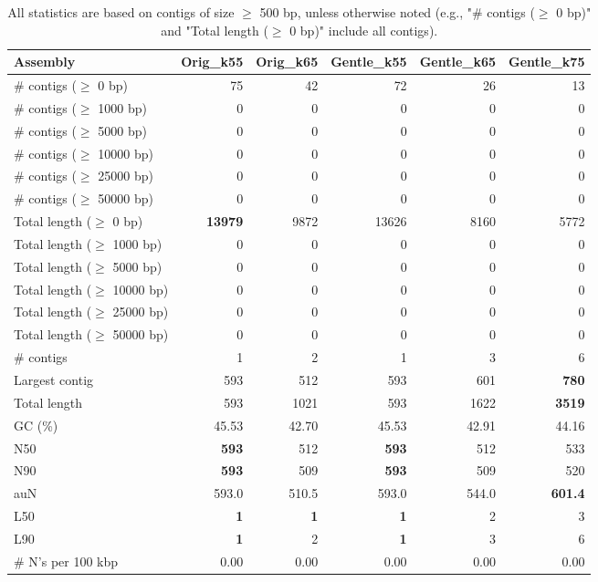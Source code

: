\documentclass[12pt,a4paper]{article}
\begin{document}
\begin{table}[ht]
\begin{center}
\caption{All statistics are based on contigs of size $\geq$ 500 bp, unless otherwise noted (e.g., "\# contigs ($\geq$ 0 bp)" and "Total length ($\geq$ 0 bp)" include all contigs).}
\begin{tabular}{|l*{5}{|r}|}
\hline
Assembly & Orig\_k55 & Orig\_k65 & Gentle\_k55 & Gentle\_k65 & Gentle\_k75 \\ \hline
\# contigs ($\geq$ 0 bp) & 75 & 42 & 72 & 26 & 13 \\ \hline
\# contigs ($\geq$ 1000 bp) & 0 & 0 & 0 & 0 & 0 \\ \hline
\# contigs ($\geq$ 5000 bp) & 0 & 0 & 0 & 0 & 0 \\ \hline
\# contigs ($\geq$ 10000 bp) & 0 & 0 & 0 & 0 & 0 \\ \hline
\# contigs ($\geq$ 25000 bp) & 0 & 0 & 0 & 0 & 0 \\ \hline
\# contigs ($\geq$ 50000 bp) & 0 & 0 & 0 & 0 & 0 \\ \hline
Total length ($\geq$ 0 bp) & {\bf 13979} & 9872 & 13626 & 8160 & 5772 \\ \hline
Total length ($\geq$ 1000 bp) & 0 & 0 & 0 & 0 & 0 \\ \hline
Total length ($\geq$ 5000 bp) & 0 & 0 & 0 & 0 & 0 \\ \hline
Total length ($\geq$ 10000 bp) & 0 & 0 & 0 & 0 & 0 \\ \hline
Total length ($\geq$ 25000 bp) & 0 & 0 & 0 & 0 & 0 \\ \hline
Total length ($\geq$ 50000 bp) & 0 & 0 & 0 & 0 & 0 \\ \hline
\# contigs & 1 & 2 & 1 & 3 & 6 \\ \hline
Largest contig & 593 & 512 & 593 & 601 & {\bf 780} \\ \hline
Total length & 593 & 1021 & 593 & 1622 & {\bf 3519} \\ \hline
GC (\%) & 45.53 & 42.70 & 45.53 & 42.91 & 44.16 \\ \hline
N50 & {\bf 593} & 512 & {\bf 593} & 512 & 533 \\ \hline
N90 & {\bf 593} & 509 & {\bf 593} & 509 & 520 \\ \hline
auN & 593.0 & 510.5 & 593.0 & 544.0 & {\bf 601.4} \\ \hline
L50 & {\bf 1} & {\bf 1} & {\bf 1} & 2 & 3 \\ \hline
L90 & {\bf 1} & 2 & {\bf 1} & 3 & 6 \\ \hline
\# N's per 100 kbp & 0.00 & 0.00 & 0.00 & 0.00 & 0.00 \\ \hline
\end{tabular}
\end{center}
\end{table}
\end{document}
